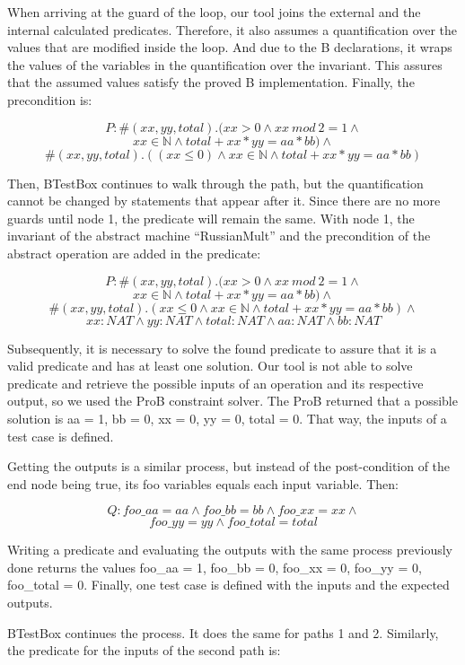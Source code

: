 \documentclass[runningheads]{llncs}
\begin{document}
When arriving at the guard of the loop, our tool joins the external and the internal calculated predicates. Therefore, it also assumes a quantification over the values that are modified inside the loop. And due to the B declarations, it wraps the values of the variables in the quantification over the invariant. This assures that the assumed values satisfy the proved B implementation. Finally, the precondition is:

$$P: \#(xx, yy, total).(xx > 0 \wedge xx\ mod\ 2 = 1 \wedge$$
$$ xx \in \mathbb{N} \wedge total + xx * yy = aa * bb) \wedge$$
$$\#(xx, yy, total).((xx \leq 0) \wedge xx \in \mathbb{N} \wedge total + xx * yy = aa * bb)$$

Then, BTestBox continues to walk through the path, but the quantification cannot be changed by statements that appear after it. Since there are no more guards until node 1, the predicate will remain the same. With node 1, the invariant of the abstract machine ``RussianMult'' and the precondition of the abstract operation are added in the predicate:

$$P: \#(xx, yy, total).(xx > 0 \wedge xx\ mod\ 2 = 1 \wedge$$
$$ xx \in \mathbb{N} \wedge total + xx * yy = aa * bb) \wedge$$
$$\#(xx, yy, total).(xx \leq 0 \wedge xx \in \mathbb{N} \wedge total + xx * yy = aa * bb) \wedge$$
$$xx : NAT \wedge yy : NAT \wedge total : NAT \wedge aa : NAT \wedge bb : NAT$$

Subsequently, it is necessary to solve the found predicate to assure that it is a valid predicate and has at least one solution. Our tool is not able to solve predicate and retrieve the possible inputs of an operation and its respective output, so we used the ProB constraint solver. The ProB returned that a possible solution is aa = 1, bb = 0, xx = 0, yy = 0, total = 0. That way, the inputs of a test case is defined.

Getting the outputs is a similar process, but instead of the post-condition of the end node being true, its foo variables equals each input variable. Then:

$$Q : foo\_aa = aa \wedge foo\_bb = bb \wedge foo\_xx = xx \wedge$$
$$foo\_yy = yy \wedge foo\_total = total$$

Writing a predicate and evaluating the outputs with the same process previously done returns the values foo\_aa = 1, foo\_bb = 0, foo\_xx = 0, foo\_yy = 0, foo\_total = 0. Finally, one test case is defined with the inputs and the expected outputs.

BTestBox continues the process. It does the same for paths 1 and 2. Similarly, the predicate for the inputs of the second path is:
\end{document}
